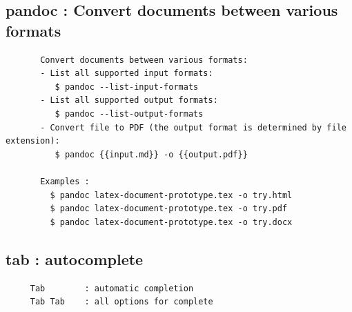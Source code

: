 \documentclass[a4paper,12pt]{article}
\begin{document}
\subsection{pandoc     : Convert documents between various formats}
\begin{verbatim}
       Convert documents between various formats:
       - List all supported input formats:
          $ pandoc --list-input-formats
       - List all supported output formats:
          $ pandoc --list-output-formats
       - Convert file to PDF (the output format is determined by file extension):
          $ pandoc {{input.md}} -o {{output.pdf}}
         
       Examples : 
         $ pandoc latex-document-prototype.tex -o try.html
         $ pandoc latex-document-prototype.tex -o try.pdf
         $ pandoc latex-document-prototype.tex -o try.docx      
\end{verbatim}


\subsection{tab     : autocomplete}
\begin{verbatim}
     Tab 		: automatic completion
     Tab Tab 	: all options for complete
\end{verbatim}
\end{document}
